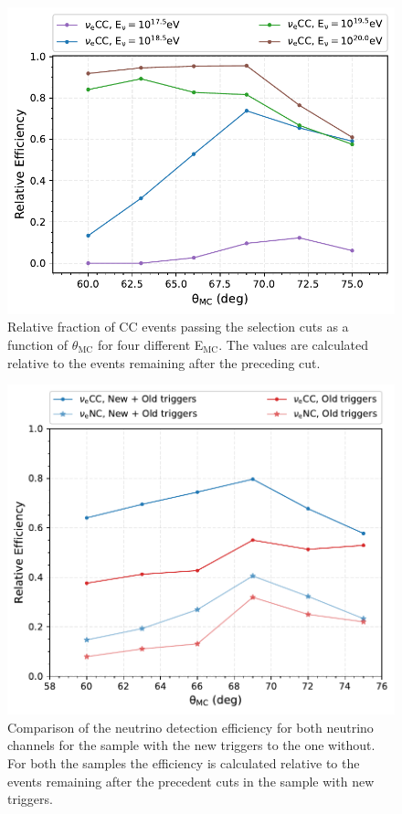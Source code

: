 \begin{figure}[h!]
  \centering
  \includegraphics[width=\textwidth]{thesis_figures/Nu_analysis/Nu_eff/Rel_efficencies_theta_E_CC_wnt_redcut.pdf}
  \caption{Relative fraction of CC events passing the selection cuts as a function of $\theta_{\text{MC}}$ for four different E$_{\text{MC}}$. The values are calculated relative to the events remaining after the preceding cut.}
  \label{fig:Eff_v_theta_CC_E}
\end{figure}


\begin{figure}[t!]
  \centering
  \includegraphics[width=\textwidth]{thesis_figures/Nu_analysis/Nu_eff/Rel_efficencies_theta_comp_redcut.pdf}
  \caption{Comparison of the neutrino detection efficiency for both neutrino channels for the sample with the new triggers to the one without. For both the samples the efficiency is calculated relative to the events remaining after the precedent cuts in the sample with new triggers.}
  \label{fig:Eff_v_theta_channel_comp}
\end{figure}


